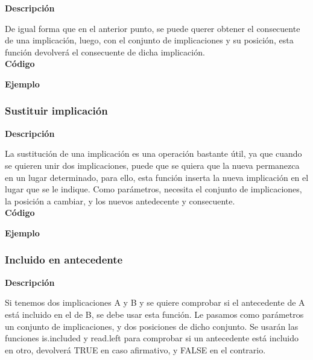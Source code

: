     \textbf{Descripci\'on}
    
    De igual forma que en el anterior punto, se puede querer obtener el consecuente de una implicaci\'on, luego, con el conjunto de 
    implicaciones y su posici\'on, esta funci\'on devolver\'a el consecuente de dicha implicaci\'on.
    \\


    \textbf{C\'odigo}

    

    \textbf{Ejemplo}


\subsubsection{Sustituir implicaci\'on}

    \textbf{Descripci\'on}

    La sustituci\'on de una implicaci\'on es una operaci\'on bastante \'util, ya que cuando se quieren unir dos implicaciones, puede que 
    se quiera que la nueva permanezca en un lugar determinado, para ello, esta funci\'on inserta la nueva implicaci\'on en el lugar que 
    se le indique. Como par\'ametros, necesita el conjunto de implicaciones, la posici\'on a cambiar, y los nuevos antedecente y consecuente.
    \\


    \textbf{C\'odigo}

    

    \textbf{Ejemplo}


\subsubsection{Incluido en antecedente}

    \textbf{Descripci\'on}

    Si tenemos dos implicaciones A y B y se quiere comprobar si el antecedente de A est\'a incluido en el de B, se debe usar 
    esta funci\'on. Le pasamos como par\'ametros un conjunto de implicaciones, y dos posiciones de dicho conjunto. Se usar\'an 
    las funciones is.included y read.left para comprobar si un antecedente est\'a incluido en otro, devolver\'a TRUE en caso 
    afirmativo, y FALSE en el contrario.
    \\


